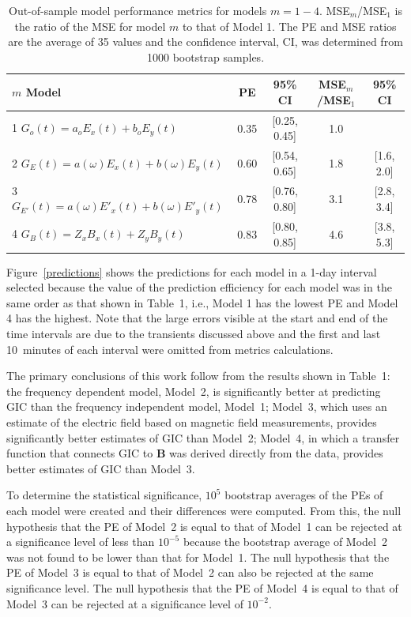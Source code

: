 \documentclass[draft,linenumbers]{agujournal2018}
\begin{document}
\begin{table}
\caption{Out-of-sample model performance metrics for models $m=1-4$. MSE$_m$/MSE$_1$ is the ratio of the MSE for model $m$ to that of Model 1. The PE and MSE ratios are the average of 35 values and the confidence interval, CI, was determined from 1000 bootstrap samples.}
\centering
\begin{tabular}{l c c c c}
\hline
$m$\hspace{1em} Model & PE & 95\% CI & MSE$_m$/MSE$_1$ & 95\% CI\\
\hline
1\hspace{1em} $G_o(t) = a_oE_x(t) + b_oE_y(t)$ & 0.35 & [0.25, 0.45] & 1.0 & \\
2\hspace{1em} $G_E(t) = a(\omega)E_x(t) + b(\omega)E_y(t)$ & 0.60 & [0.54, 0.65] & 1.8 & [1.6, 2.0]\\
3\hspace{1em} $G_{E'}(t) = a(\omega)E'_x(t) + b(\omega)E'_y(t)$ & 0.78 & [0.76, 0.80] & 3.1 & [2.8, 3.4]\\
4\hspace{1em} $G_{B}(t) = Z_xB_x(t) + Z_yB_y(t)$ & 0.83 & [0.80, 0.85] & 4.6 & [3.8, 5.3]\\
\hline
\end{tabular}
\end{table}

Figure~\ref{predictions} shows the predictions for each model in a 1-day interval selected because the value of the prediction efficiency for each model was in the same order as that shown in Table~1, i.e., Model 1 has the lowest PE and Model 4 has the highest. Note that the large errors visible at the start and end of the time intervals are due to the transients discussed above and the first and last 10~minutes of each interval were omitted from metrics calculations.

The primary conclusions of this work follow from the results shown in Table~1: the frequency dependent model, Model~2, is significantly better at predicting GIC than the frequency independent model, Model~1; Model~3, which uses an estimate of the electric field based on magnetic field measurements, provides significantly better estimates of GIC than Model~2; Model~4, in which a transfer function that connects GIC to $\mathbf{B}$ was derived directly from the data, provides better estimates of GIC than Model~3.

To determine the statistical significance, $10^5$ bootstrap averages of the PEs of each model were created and their differences were computed. From this, the null hypothesis that the PE of Model~2 is equal to that of Model~1 can be rejected at a significance level of less than $10^{-5}$ because the bootstrap average of Model~2 was not found to be lower than that for Model~1. The null hypothesis that the PE of Model~3 is equal to that of Model~2 can also be rejected at the same significance level. The null hypothesis that the PE of Model~4 is equal to that of Model~3 can be rejected at a significance level of $10^{-2}$.
\end{document}

